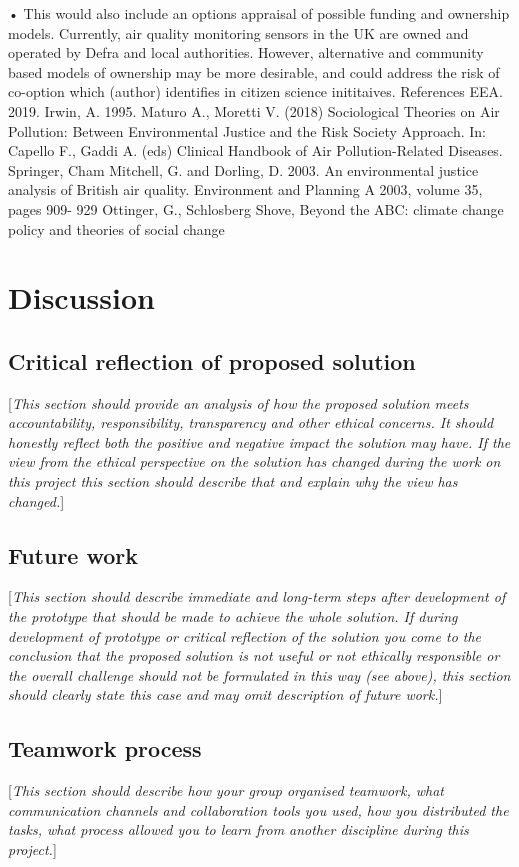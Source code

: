 \documentclass[10pt,english, openany]{book}
\begin{document}
{•	
This would also include an options appraisal of possible funding and ownership models. Currently, air quality monitoring sensors in the UK are owned and operated by Defra and local authorities. However, alternative and community based models of ownership may be more desirable, and could address the risk of co-option which (author) identifies in citizen science inititaives. 
References 
EEA. 2019.  
Irwin, A. 1995. 
Maturo A., Moretti V. (2018) Sociological Theories on Air Pollution: Between Environmental Justice and the Risk Society Approach. In: Capello F., Gaddi A. (eds) Clinical Handbook of Air Pollution-Related Diseases. Springer, Cham 
Mitchell, G. and Dorling, D. 2003. An environmental justice analysis of British air quality. Environment and Planning A 2003, volume 35, pages 909- 929 
Ottinger, G., 
Schlosberg 
Shove, Beyond the ABC: climate change policy and theories of social change
}


\chapter{Discussion}\label{chapt:results}
\section{Critical reflection of proposed solution}
[\textit{This section should provide an analysis of how the proposed solution meets accountability, responsibility, transparency and other ethical concerns. It should honestly reflect both the positive and negative impact the solution may have. If the view from the ethical perspective on the solution has changed during the work on this project this section should describe that and explain why the view has changed.}]

\section{Future work}
[\textit{This section should describe immediate and long-term steps after development of the prototype that should be made to achieve the whole solution. If during development of prototype or critical reflection of the solution you come to the conclusion that the proposed solution is not useful or not ethically responsible or the overall challenge should not be formulated in this way (see above), this section should clearly state this case and may omit description of future work.}]

\section{Teamwork process}
[\textit{This section should describe how your group organised teamwork, what communication channels and collaboration tools you used, how you distributed the tasks, what process allowed you to learn from another discipline during this project.}]
\end{document}
